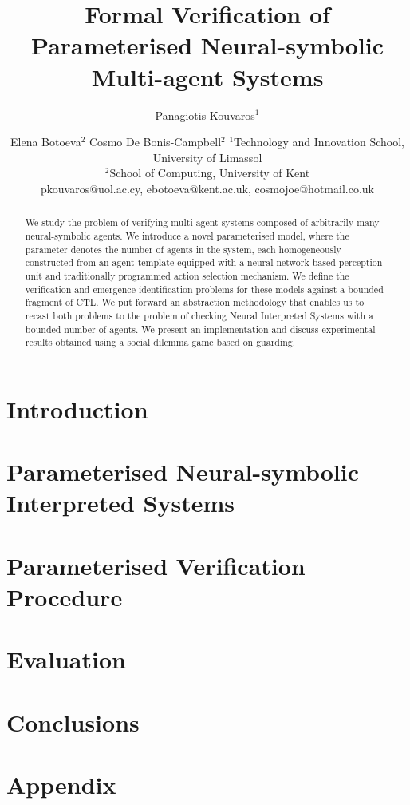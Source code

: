 \documentclass{article}
\title{Formal Verification of  Parameterised Neural-symbolic Multi-agent Systems}
\author{
Panagiotis Kouvaros$^1$
\and
Elena Botoeva$^2$\And
Cosmo De Bonis-Campbell$^{2}$
\affiliations
$^1$Technology and Innovation School, University of Limassol\\
$^2$School of Computing, University of Kent\\
\emails
pkouvaros@uol.ac.cy,
ebotoeva@kent.ac.uk,
cosmojoe@hotmail.co.uk
}
\begin{document}
\maketitle

\begin{abstract}

We study the problem of verifying multi-agent systems composed of arbitrarily
many neural-symbolic agents. We introduce a novel parameterised model, where the
parameter denotes the number of agents in the system, each homogeneously
constructed from an agent template equipped with a neural network-based
perception unit  and traditionally programmed action selection mechanism. We
define the verification and emergence identification problems for these models
against a bounded fragment of CTL. We put forward an abstraction methodology
that enables us to recast both problems to the problem of checking Neural
Interpreted Systems with a bounded number of agents. We present an
implementation and discuss experimental results obtained using a social dilemma
game based on guarding.

\end{abstract}

\section{Introduction}
\label{sec:intro}


\section{Parameterised Neural-symbolic Interpreted Systems}
\label{sec:pnis}


\section{Parameterised Verification Procedure}
\label{sec:verification}


\section{Evaluation}
\label{sec:eval}


\section{Conclusions}
\label{sec:conclusions}







\section*{Appendix}

\end{document}
